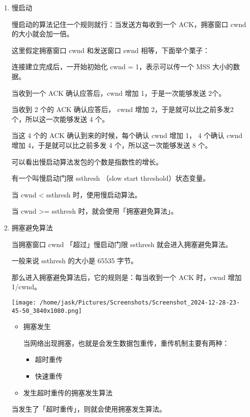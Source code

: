 \documentclass[11pt]{article}
\begin{document}
\begin{enumerate}
\item 慢启动
\label{sec:org5b7a7a9}

慢启动的算法记住一个规则就行：当发送方每收到一个 ACK，拥塞窗口 cwnd 的大小就会加一倍。

这里假定拥塞窗口 cwnd 和发送窗口 swnd 相等，下面举个栗子：

连接建立完成后，一开始初始化 cwnd = 1，表示可以传一个 MSS 大小的数据。

当收到一个 ACK 确认应答后，cwnd 增加 1，于是一次能够发送 2个。

当收到 2 个的 ACK 确认应答后， cwnd 增加 2，于是就可以比之前多发2 个，所以这一次能够发送 4 个。

当这 4 个的 ACK 确认到来的时候，每个确认 cwnd 增加 1， 4 个确认 cwnd 增加 4，于是就可以比之前多发 4 个，所以这一次能够发送 8 个。

可以看出慢启动算法发包的个数是指数性的增长。

有一个叫慢启动门限 ssthresh （slow start threshold）状态变量。

当 cwnd < ssthresh 时，使用慢启动算法。

当 cwnd >= ssthresh 时，就会使用「拥塞避免算法」。
\item 拥塞避免算法
\label{sec:orge59d4b3}

当拥塞窗口 cwnd 「超过」慢启动门限 ssthresh 就会进入拥塞避免算法。

一般来说 ssthresh 的大小是 65535 字节。

那么进入拥塞避免算法后，它的规则是：每当收到一个 ACK 时，cwnd 增加 1/cwnd。

\begin{center}
\texttt{[image: /home/jask/Pictures/Screenshots/Screenshot\_2024-12-28-23-45-50\_3840x1080.png]}
\end{center}

\begin{itemize}
\item 拥塞发生

当网络出现拥塞，也就是会发生数据包重传，重传机制主要有两种：
\begin{itemize}
\item 超时重传

\item 快速重传
\end{itemize}
\item 发生超时重传的拥塞发生算法
\end{itemize}

当发生了「超时重传」，则就会使用拥塞发生算法。


\end{enumerate}
\end{document}
